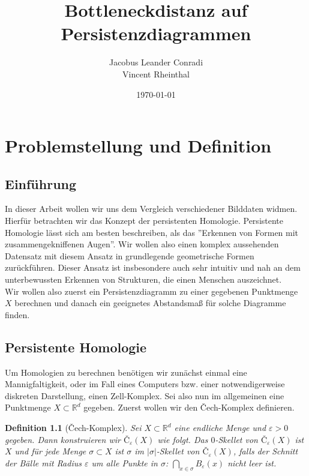 \documentclass[11pt, a4paper,draft]{report}
\author{Jacobus Leander Conradi\\Vincent Rheinthal}
\date{\today}
\title{Bottleneckdistanz auf Persistenzdiagrammen}
\newtheorem{definition}{Definition}
\newcommand{\bR}{\mathbb{R}}
\begin{document}
 
	\maketitle
	
	\thispagestyle{plain}
	\addtocounter{page}{-1}
	\tableofcontents 
	\vfil\null
	\clearpage
	\thispagestyle{empty}\mbox{}
	\clearpage
	
	\chapter{Problemstellung und Definition}
	\section{Einführung}
	In dieser Arbeit wollen wir uns dem Vergleich verschiedener Bilddaten widmen. Hierfür betrachten wir das Konzept der persistenten Homologie. Persistente Homologie lässt sich am besten beschreiben, als das ''Erkennen von Formen mit zusammengekniffenen Augen''. Wir wollen also einen komplex aussehenden Datensatz mit diesem Ansatz in grundlegende geometrische Formen zurückführen. Dieser Ansatz ist insbesondere auch sehr intuitiv und nah an dem unterbewussten Erkennen von Strukturen, die einen Menschen auszeichnet.\\
	Wir wollen also zuerst ein Persistenzdiagramm zu einer gegebenen Punktmenge $X$ berechnen und danach ein geeignetes Abstandsmaß für solche Diagramme finden.
	
	\section{Persistente Homologie}
	
	Um Homologien zu berechnen benötigen wir zunächst einmal eine Mannigfaltigkeit, oder im Fall eines Computers bzw. einer notwendigerweise diskreten Darstellung, einen Zell-Komplex. Sei also nun im allgemeinen eine Punktmenge $X\subset \bR^d$ gegeben. Zuerst wollen wir den Čech-Komplex definieren.
	
	\begin{definition}[Čech-Komplex]
		Sei $X\subset \bR^d$ eine endliche Menge und $\varepsilon>0$ gegeben. Dann konstruieren wir $Č_\varepsilon(X)$ wie folgt. Das $0$-Skellet von $Č_\varepsilon(X)$ ist $X$ und für jede Menge $\sigma\subset X$ ist $\sigma$ im $|\sigma|$-Skellet von $Č_\varepsilon(X)$, falls der Schnitt der Bälle mit Radius $\varepsilon$ um alle Punkte in $\sigma$: $\bigcap_{x\in\sigma}B_\varepsilon(x)$ nicht leer ist.
	\end{definition}
\end{document}
